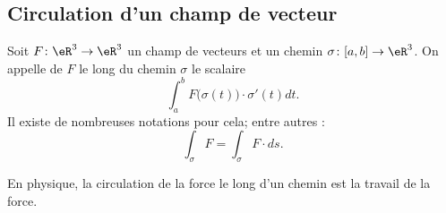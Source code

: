 \subsection{Circulation d'un champ de vecteur}

\begin{definition}
    Soit $F\colon \eR^3\to \eR^3$ un champ de vecteurs et un chemin $\sigma\colon \mathopen[ a , b \mathclose]\to \eR^3$. On appelle  de $F$ le long du chemin $\sigma$ le scalaire
    \begin{equation}        \label{EqDeffvkZwh}
        \int_a^b F\big( \sigma(t) \big)\cdot \sigma'(t)dt.
    \end{equation}
    Il existe de nombreuses notations pour cela; entre autres :
    \begin{equation}
        \int_{\sigma}F=\int_{\sigma} F\cdot ds.
    \end{equation}
\end{definition}

En physique, la circulation de la force le long d'un chemin est la travail de la force.

